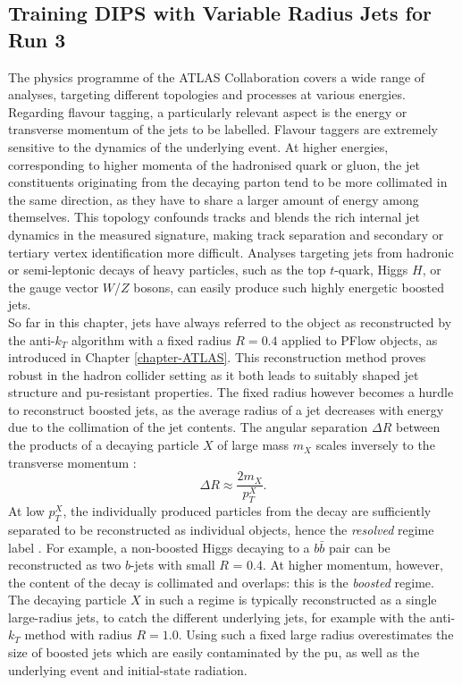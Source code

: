 \subsection{Training DIPS with Variable Radius Jets for Run 3}\label{chapter:dipsVRtrain}
The physics programme of the ATLAS Collaboration covers a wide range of analyses, targeting different topologies and processes at various energies. Regarding flavour tagging, a particularly relevant aspect is the energy or transverse momentum of the jets to be labelled. Flavour taggers are extremely sensitive to the dynamics of the underlying event. At higher energies, corresponding to higher momenta of the hadronised quark or gluon, the jet constituents originating from the decaying parton tend to be more collimated in the same direction, as they have to share a larger amount of energy among themselves. This topology confounds tracks and blends the rich internal jet dynamics in the measured signature, making track separation and secondary or tertiary vertex identification more difficult. Analyses targeting jets from hadronic or semi-leptonic decays of heavy particles, such as the top $t$-quark, Higgs $H$, or the gauge vector $W$/$Z$ bosons, can easily produce such highly energetic boosted jets.  \\

So far in this chapter, jets have always referred to the object as reconstructed by the anti-$k_T$ algorithm with a fixed radius $R = 0.4$ applied to PFlow objects, as introduced in Chapter \ref{chapter-ATLAS}. This reconstruction method proves robust in the hadron collider setting as it both leads to suitably shaped jet structure and \gls{pu}-resistant properties. The fixed radius however becomes a hurdle to reconstruct boosted jets, as the average radius of a jet decreases with energy due to the collimation of the jet contents. The angular separation $\Delta R$ between the products of a decaying particle $X$ of large mass $m_X$ scales inversely to the transverse momentum \cite{ATLAS:largeRjet}: 
\begin{equation}\label{eq:sizeJet}
  \Delta R \approx \frac{2 m_X}{p_T^X}.
\end{equation}
At low $p_T^X$, the individually produced particles from the decay are sufficiently separated to be reconstructed as individual objects, hence the \textit{resolved} regime label \cite{ATLAS:2016hcf}. For example, a non-boosted Higgs decaying to a $b\bar{b}$ pair can be reconstructed as two $b$-jets with small $R$ = 0.4. At higher momentum, however, the content of the decay is collimated and overlaps: this is the \textit{boosted} regime. The decaying particle $X$ in such a regime is typically reconstructed as a single large-radius jets, to catch the different underlying jets, for example with the anti-$k_T$ method with radius $R = 1.0$. Using such a fixed large radius overestimates the size of boosted jets which are easily contaminated by the \gls{pu}, as well as the underlying event and initial-state radiation.  \\

